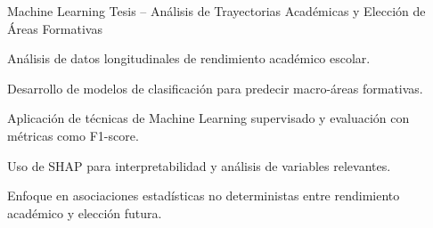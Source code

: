 
\begin{cventries}

\cventry
  {Machine Learning}
  {Tesis – Análisis de Trayectorias Académicas y Elección de Áreas Formativas}
  {}
  {}
  {
    \begin{cvitems}
      \item {Análisis de datos longitudinales de rendimiento académico escolar.}
      \item {Desarrollo de modelos de clasificación para predecir macro-áreas formativas.}
      \item {Aplicación de técnicas de Machine Learning supervisado y evaluación con métricas como F1-score.}
      \item {Uso de SHAP para interpretabilidad y análisis de variables relevantes.}
      \item {Enfoque en asociaciones estadísticas no deterministas entre rendimiento académico y elección futura.}
    \end{cvitems}
    \vspace{5mm}
  }


\end{cventries}

